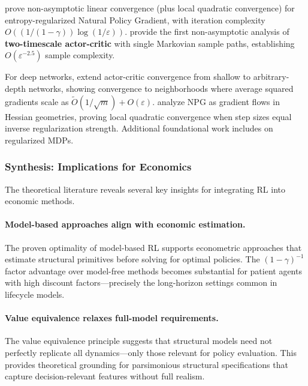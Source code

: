 \citet{cen2022fast} prove non-asymptotic linear convergence (plus local quadratic convergence) for entropy-regularized Natural Policy Gradient, with iteration complexity $O((1/(1-\gamma))\log(1/\varepsilon))$. \citet{wu2020twotimescale} provide the first non-asymptotic analysis of \textbf{two-timescale actor-critic} with single Markovian sample paths, establishing $O(\varepsilon^{-2.5})$ sample complexity.

For deep networks, \citet{li2023actorcritic} extend actor-critic convergence from shallow to arbitrary-depth networks, showing convergence to neighborhoods where average squared gradients scale as $\tilde{O}(1/\sqrt{m}) + O(\varepsilon)$. \citet{muller2024npg} analyze NPG as gradient flows in Hessian geometries, proving local quadratic convergence when step sizes equal inverse regularization strength. Additional foundational work includes \citet{geist2019regularized} on regularized MDPs.

\subsubsection{Synthesis: Implications for Economics}

The theoretical literature reveals several key insights for integrating RL into economic methods.

\paragraph{Model-based approaches align with economic estimation.} The proven optimality of model-based RL \citep{zhang2024settling,li2024breaking} supports econometric approaches that estimate structural primitives before solving for optimal policies. The $(1-\gamma)^{-1}$ factor advantage over model-free methods becomes substantial for patient agents with high discount factors---precisely the long-horizon settings common in lifecycle models.

\paragraph{Value equivalence relaxes full-model requirements.} The value equivalence principle \citep{grimm2020value} suggests that structural models need not perfectly replicate all dynamics---only those relevant for policy evaluation. This provides theoretical grounding for parsimonious structural specifications that capture decision-relevant features without full realism.

